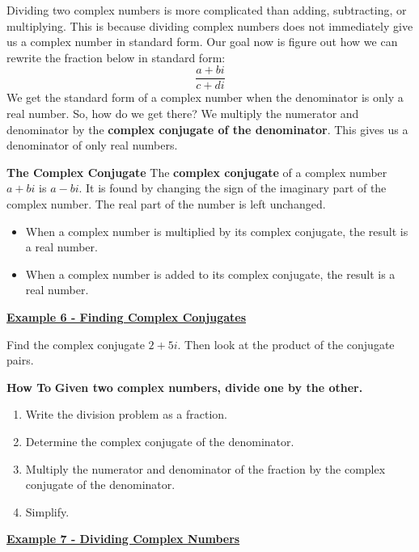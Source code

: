\documentclass[12pt]{book}
\begin{document}
Dividing two complex numbers is more complicated than adding, subtracting, or multiplying. This is because dividing complex numbers does not immediately give us a complex number in standard form. Our goal now is figure out how we can rewrite the fraction below in standard form:$$ \frac{a+bi}{c+di}$$
We get the standard form of a complex number when the denominator is only a real number. So, how do we get there? We multiply the numerator and denominator by the \textbf{complex conjugate of the denominator}. This gives us a denominator of only real numbers. 
\vspace{3mm}
\begin{boxR}
     \textbf{The Complex Conjugate}
    \vspace{1mm}
    \hline
    \vspace{2mm}
    The \textbf{complex conjugate} of a complex number $a+bi$ is $a-bi$.
  It is found by changing the sign of the imaginary part of the complex number. The real part of the number is left unchanged.
\begin{itemize}
    \item When a complex number is multiplied by its complex conjugate, the result is a real number.
    \item When a complex number is added to its complex conjugate, the result is a real number.
\end{itemize}
\end{boxR}
\vspace{3mm}
\underline{\textbf{Example 6 - Finding Complex Conjugates}}

Find the complex conjugate $2 + 5i$. Then look at the product of the conjugate pairs. 



\newpage
\vspace{3mm}
\begin{boxR}
     \textbf{How To}
    \vspace{1mm}
    \hline
    \vspace{2mm}
 \textbf{ Given two complex numbers, divide one by the other.}
\begin{enumerate}
    \item Write the division problem as a fraction.
    \item Determine the complex conjugate of the denominator.
    \item Multiply the numerator and denominator of the fraction by the complex conjugate of the denominator.
    \item Simplify.
\end{enumerate}
\end{boxR}
\vspace{3mm}
\underline{\textbf{Example 7 - Dividing Complex Numbers}}
\end{document}
